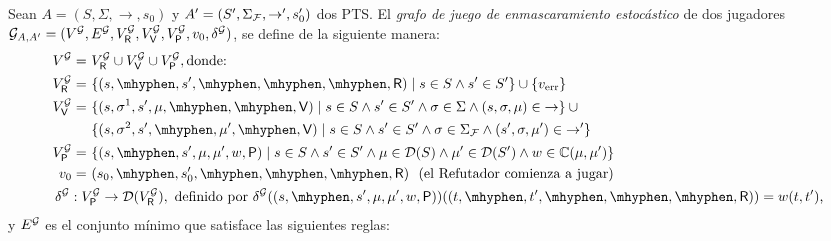 \begin{definition} \label{def:strong_masking_game_graphi}
  Sean $A =( S, \Sigma, {\rightarrow}, s_0 )$ y
  $A' = ( S', \Sigma_{\mathcal{F}} , {\rightarrow'}, s'_0 )$ dos PTS.
  El \emph{grafo de juego de enmascaramiento estocástico} de dos jugadores
  $\mathcal{G}_{A,A'} = (V^{\mathcal{G}}, E^{\mathcal{G}}, V^{\mathcal{G}}_{\mathsf{R}}, V^{\mathcal{G}}_{\mathsf{V}}, V^{\mathcal{G}}_{\mathsf{P}}, v_0, \delta^{\mathcal{G}})$,
   se define de la siguiente manera:
%
  {\small%
  \begin{align*}
    V^\StochG = \
    & V^\StochG_\Refuter \cup V^\StochG_\Verifier \cup V^\StochG_\Probabilistic, \text{donde: }\\
    V^\StochG_\Refuter = \
    & \{ (s, \mhyphen, s', \mhyphen, \mhyphen, \mhyphen, \Refuter) \mid
          s \in S \wedge s' \in S' \} \cup
      \{\ErrorSt\}\\
    V^\StochG_\Verifier = \
    & \{ (s, \sigma^1, s', \mu, \mhyphen, \mhyphen, \Verifier) \mid
         s \in S \wedge s' \in S'
         \wedge \sigma \in \Sigma
         \wedge (s, \sigma, \mu) \in {\rightarrow} \} \cup {} \\
    & \{ (s, \sigma^2, s', \mhyphen, \mu', \mhyphen, \Verifier) \mid
         s \in S \wedge s' \in S'
         \wedge \sigma \in \SigmaF
         \wedge (s', \sigma, \mu') \in {\rightarrow'}\}\\
    V^\StochG_\Probabilistic = \
    & \{ (s, \mhyphen, s', \mu, \mu', w, \Probabilistic) \mid
         s \in S \wedge s' \in S' \wedge %
         \mu \in \Dist(S) \wedge \mu' \in \Dist(S')
         \wedge w \in \couplings{\mu}{\mu'}\}\\
    \InitVertex = \
    & ( s_0, \mhyphen, s'_0, \mhyphen, \mhyphen, \mhyphen, \Refuter )
    \text{ \ (el Refutador comienza a jugar)}\\
    & \hspace{-2.6em}
    \delta^\StochG : V^\StochG_\Probabilistic \rightarrow \Dist(V^\StochG_\Refuter),
      \text{ definido por } 
      \delta^\StochG((s, \mhyphen, s', \mu, \mu', w, \Probabilistic))((t, \mhyphen, t', \mhyphen, \mhyphen, \mhyphen, \Refuter)) = w(t,t')
      \text{,}
  \end{align*}
  }%
%
  y $E^{\mathcal{G}}$ es el conjunto mínimo que satisface las siguientes reglas:
%
  {\small%
}
\end{definition}
